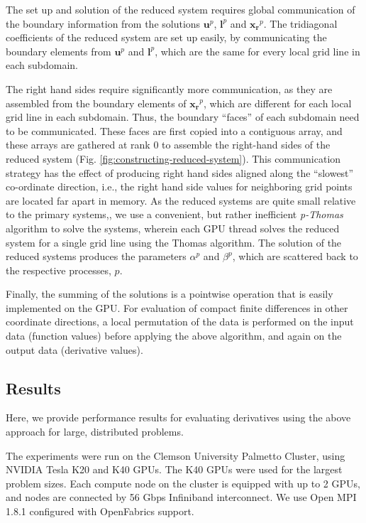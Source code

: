 \documentclass{elsarticle}
\begin{document}
The set up and solution of the reduced system
requires global communication of the boundary information
from the solutions $\bm{u}^p$, $\bm{l}^p$ and $\bm{x_r}^p$.
The tridiagonal coefficients of the reduced system
are set up easily,
by communicating the boundary elements from
$\bm{u}^p$ and $\bm{l}^p$,
which are the same for every local grid line in each subdomain.

The right hand sides require significantly more communication,
as they are assembled from the boundary elements of $\bm{x_r}^p$,
which are different for each local grid line in each subdomain.
Thus, the boundary ``faces'' of each subdomain need to be communicated.
These faces are first copied into a contiguous array,
and these arrays are gathered at rank 0
to assemble the right-hand sides of the reduced system
(Fig. \ref{fig:constructing-reduced-system}).
This communication strategy has the effect of
producing right hand sides aligned along the
``slowest'' co-ordinate direction, i.e.,
the right hand side values for neighboring grid points
are located far apart in memory.
As the reduced systems are quite small relative to the primary systems,,
we use a convenient, but rather inefficient
\emph{p-Thomas} algorithm to solve the systems,
wherein each GPU thread solves the reduced system
for a single grid line using the Thomas algorithm.
The solution of the reduced systems produces the parameters
$\alpha^p$ and $\beta^p$,
which are scattered back to the respective processes, $p$.

Finally, the summing of the solutions
is a pointwise operation that is easily implemented
on the GPU.
For evaluation of compact finite differences in other
coordinate directions,
a local permutation of the data is performed on the input data
(function values)
before applying the above algorithm,
and again on the output data
(derivative values).

\subsection{Results}

Here, we provide performance results for
evaluating derivatives using the above approach
for large, distributed problems.

The experiments were run on the
Clemson University Palmetto Cluster,
using NVIDIA Tesla K20 and K40 GPUs.
The K40 GPUs were used for the largest problem sizes.
Each compute node on the cluster is equipped with up to 2 GPUs,
and nodes are connected by 56 Gbps Infiniband interconnect.
We use Open MPI 1.8.1 configured with OpenFabrics support.
\end{document}
